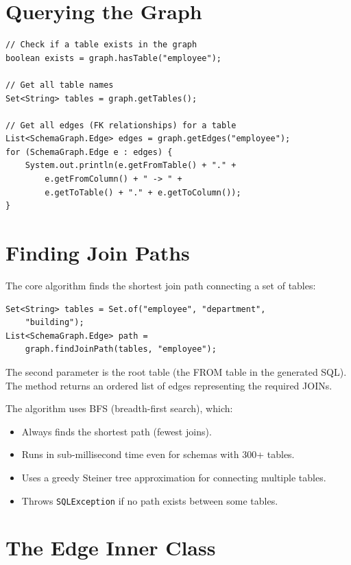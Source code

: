 \section{Querying the Graph}
\label{sec:sg-querying}

\begin{lstlisting}[style=java]
// Check if a table exists in the graph
boolean exists = graph.hasTable("employee");

// Get all table names
Set<String> tables = graph.getTables();

// Get all edges (FK relationships) for a table
List<SchemaGraph.Edge> edges = graph.getEdges("employee");
for (SchemaGraph.Edge e : edges) {
    System.out.println(e.getFromTable() + "." +
        e.getFromColumn() + " -> " +
        e.getToTable() + "." + e.getToColumn());
}
\end{lstlisting}

\section{Finding Join Paths}
\label{sec:sg-paths}

The core algorithm finds the shortest join path connecting a set of tables:

\begin{lstlisting}[style=java]
Set<String> tables = Set.of("employee", "department",
    "building");
List<SchemaGraph.Edge> path =
    graph.findJoinPath(tables, "employee");
\end{lstlisting}

\noindent
The second parameter is the root table (the FROM table in the generated SQL).  The method returns an ordered list of edges representing the required JOINs.

The algorithm uses BFS (breadth-first search), which:
\begin{itemize}
  \item Always finds the shortest path (fewest joins).
  \item Runs in sub-millisecond time even for schemas with 300+ tables.
  \item Uses a greedy Steiner tree approximation for connecting multiple tables.
  \item Throws \texttt{SQLException} if no path exists between some tables.
\end{itemize}

\section{The Edge Inner Class}
\label{sec:sg-edge}

